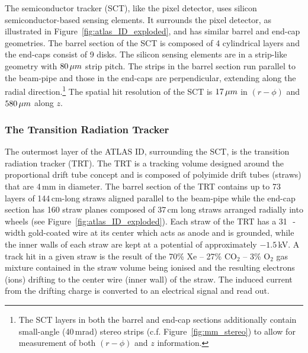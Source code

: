 The semiconductor tracker (SCT), like the pixel detector, uses silicon semiconductor-based sensing
elements.
It surrounds the pixel detector, as illustrated in Figure~\ref{fig:atlas_ID_exploded},
and has similar barrel and end-cap geometries.
The barrel section of the SCT is composed of 4 cylindrical layers and the end-caps consist
of 9 disks.
The silicon sensing elements are in a strip-like geometry with
$80\,\mu m$ strip pitch.
The strips in the barrel section run parallel to the beam-pipe and those in the
end-caps are perpendicular, extending along the radial direction.\footnote{
The SCT layers in both the barrel and end-cap sections additionally contain small-angle (40\,mrad) stereo strips (c.f. Figure~\ref{fig:mm_stereo}) to allow for measurement of both
$(r-\phi)$ and $z$ information.}
The spatial hit resolution of the SCT is $17\,\mu m$ in $(r-\phi)$ and $580\,\mu m$
along $z$.

\subsubsection{The Transition Radiation Tracker}
\label{sec:trt}

The outermost layer of the ATLAS ID, surrounding the SCT, is the transition
radiation tracker (TRT).
The TRT is a tracking volume designed around the proportional drift tube concept
and is composed of polyimide drift tubes (straws) that are 4\,mm in diameter.
The barrel section of the TRT contains up to 73 layers of 144\,cm-long straws aligned parallel to the
beam-pipe while the end-cap section has 160 straw planes composed of 37\,cm long straws arranged radially
into wheels (see Figure~\ref{fig:atlas_ID_exploded}).
Each straw of the TRT has a 31\,\micron~-width gold-coated wire at its center which acts as anode
and is grounded, while the inner walls of each straw are kept at a potential of
approximately $-1.5$\,kV.
A track hit in a given straw is the result of the 70\% Xe -- 27\% CO$_2$ -- 3\% O$_2$ gas mixture contained
in the straw volume being ionised and the resulting electrons (ions) drifting to
the center wire (inner wall) of the straw. The induced current from the drifting
charge is converted to an electrical signal and read out.

